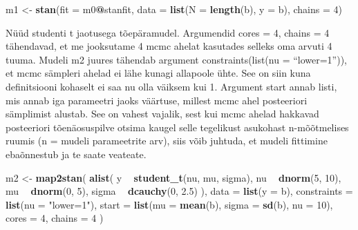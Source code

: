 \documentclass[]{book}
\newenvironment{Shaded}{\begin{snugshade}}{\end{snugshade}}
\newcommand{\KeywordTok}[1]{\textcolor[rgb]{0.13,0.29,0.53}{\textbf{#1}}}
\newcommand{\DataTypeTok}[1]{\textcolor[rgb]{0.13,0.29,0.53}{#1}}
\newcommand{\DecValTok}[1]{\textcolor[rgb]{0.00,0.00,0.81}{#1}}
\newcommand{\FloatTok}[1]{\textcolor[rgb]{0.00,0.00,0.81}{#1}}
\newcommand{\StringTok}[1]{\textcolor[rgb]{0.31,0.60,0.02}{#1}}
\newcommand{\OperatorTok}[1]{\textcolor[rgb]{0.81,0.36,0.00}{\textbf{#1}}}
\newcommand{\NormalTok}[1]{#1}
\begin{document}
\begin{Shaded}
\begin{Highlighting}[]
\NormalTok{m1 <-}\StringTok{ }\KeywordTok{stan}\NormalTok{(}\DataTypeTok{fit =}\NormalTok{ m0}\OperatorTok{@}\NormalTok{stanfit,}
           \DataTypeTok{data =} \KeywordTok{list}\NormalTok{(}\DataTypeTok{N =} \KeywordTok{length}\NormalTok{(b), }
                       \DataTypeTok{y =}\NormalTok{ b),}
           \DataTypeTok{chains =} \DecValTok{4}\NormalTok{)}
\end{Highlighting}
\end{Shaded}

Nüüd studenti t jaotusega tõepäramudel. Argumendid cores = 4, chains = 4
tähendavad, et me jooksutame 4 mcmc ahelat kasutades selleks oma arvuti
4 tuuma. Mudeli m2 juures tähendab argument constraints(list(nu =
``lower=1'')), et mcmc sämpleri ahelad ei lähe kunagi allapoole ühte.
See on siin kuna definitsiooni kohaselt ei saa nu olla väiksem kui 1.
Argument start annab listi, mis annab iga parameetri jaoks väärtuse,
millest mcmc ahel posteeriori sämplimist alustab. See on vahest vajalik,
sest kui mcmc ahelad hakkavad posteeriori tõenäosuspilve otsima kaugel
selle tegelikust asukohast n-mõõtmelises ruumis (n = mudeli parameetrite
arv), siis võib juhtuda, et mudeli fittimine ebaõnnestub ja te saate
veateate.

\begin{Shaded}
\begin{Highlighting}[]
\NormalTok{m2 <-}\StringTok{ }\KeywordTok{map2stan}\NormalTok{(}
  \KeywordTok{alist}\NormalTok{(}
\NormalTok{    y }\OperatorTok{~}\StringTok{ }\KeywordTok{student_t}\NormalTok{(nu, mu, sigma),}
\NormalTok{    nu }\OperatorTok{~}\StringTok{ }\KeywordTok{dnorm}\NormalTok{(}\DecValTok{5}\NormalTok{, }\DecValTok{10}\NormalTok{), }
\NormalTok{    mu }\OperatorTok{~}\StringTok{ }\KeywordTok{dnorm}\NormalTok{(}\DecValTok{0}\NormalTok{, }\DecValTok{5}\NormalTok{),}
\NormalTok{    sigma }\OperatorTok{~}\StringTok{ }\KeywordTok{dcauchy}\NormalTok{(}\DecValTok{0}\NormalTok{, }\FloatTok{2.5}\NormalTok{)}
\NormalTok{    ),}
  \DataTypeTok{data =} \KeywordTok{list}\NormalTok{(}\DataTypeTok{y =}\NormalTok{ b),}
  \DataTypeTok{constraints =} \KeywordTok{list}\NormalTok{(}\DataTypeTok{nu =} \StringTok{"lower=1"}\NormalTok{),}
  \DataTypeTok{start =} \KeywordTok{list}\NormalTok{(}\DataTypeTok{mu =} \KeywordTok{mean}\NormalTok{(b), }\DataTypeTok{sigma =} \KeywordTok{sd}\NormalTok{(b), }\DataTypeTok{nu =} \DecValTok{10}\NormalTok{),}
  \DataTypeTok{cores =} \DecValTok{4}\NormalTok{,}
  \DataTypeTok{chains =} \DecValTok{4}
\NormalTok{)}
\end{Highlighting}
\end{Shaded}
\end{document}
